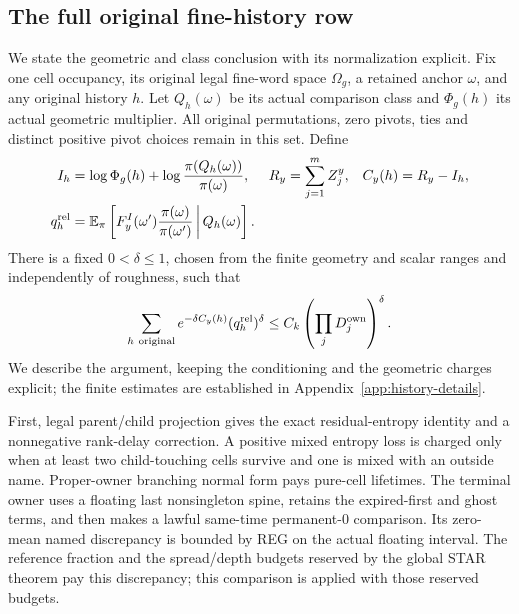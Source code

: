 \subsection{The full original fine-history row}
\label{lower:row}
We state the geometric and class conclusion with its normalization
explicit.  Fix one cell occupancy, its original legal fine-word space
$\Omega_g$, a retained anchor $\omega$, and any original history $h$.
Let $Q_h(\omega)$ be its actual comparison class and $\Phi_g(h)$
its actual geometric multiplier.  All original permutations, zero
pivots, ties and distinct positive pivot choices remain in this set.
Define
\begin{align}
 I_h&=\log\Phi_g(h)+\log\frac{\pi(Q_h(\omega))}{\pi(\omega)},
 &R_y&=\sum_{j=1}^m Z_j^y,
 &C_y(h)&=R_y-I_h,\notag\\
 q_h^{\rm rel}
 &=\mathbb E_\pi\left[
 F_y^I(\omega')\frac{\pi(\omega)}{\pi(\omega')}
                  \,\middle|\,Q_h(\omega)\right].
 \label{lower:class-defs}
\end{align}
There is a fixed $0<\delta\leq1$, chosen from the finite geometry and
scalar ranges and independently of roughness, such that
\begin{equation}
 \sum_{h\ \mathrm{original}}
        e^{-\delta C_y(h)}(q_h^{\rm rel})^\delta
       \leq C_k\left(\prod_jD_j^{\rm own}\right)^\delta.
 \label{lower:posterior-row}
\end{equation}
We describe the argument, keeping the conditioning and the geometric
charges explicit; the finite estimates are established in
Appendix~\ref{app:history-details}.

First, legal parent/child projection gives the exact residual-entropy
identity and a nonnegative rank-delay correction.  A positive mixed
entropy loss is charged only when at least two child-touching cells
survive and one is mixed with an outside name.  Proper-owner branching
normal form pays pure-cell lifetimes.  The terminal owner uses a
floating last nonsingleton spine, retains the expired-first and ghost
terms, and then makes a lawful same-time permanent-$0$ comparison.
Its zero-mean named discrepancy is bounded by REG on the actual
floating interval.  The reference fraction and the spread/depth
budgets reserved by the global STAR theorem pay this discrepancy;
this comparison is applied with those reserved budgets.

